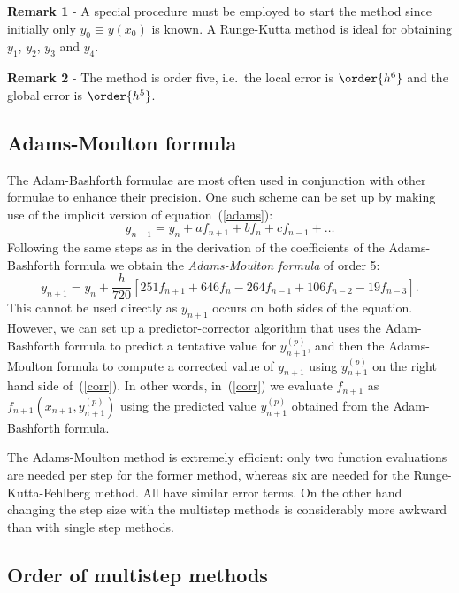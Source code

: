 \smallskip

\noindent \textbf{Remark 1} - A special procedure must be employed to
start the method since initially only $y_0 \equiv y(x_0)$ is known. A
Runge-Kutta method is ideal for obtaining $y_1$, $y_2$, $y_3$ and
$y_4$.

\smallskip

\noindent \textbf{Remark 2} - The method is order five, i.e.\ the local
error is $\order{h^6}$ and the global error is $\order{h^5}$.

\subsection{Adams-Moulton formula}

The Adam-Bashforth formulae are most often used in conjunction with
other formulae to enhance their precision.  One such scheme can be set
up by making use of the implicit version of equation~(\ref{adams}):
%
\begin{equation}
  y_{n+1} = y_n + a f_{n+1} + b f_n + c f_{n-1} + \ldots
\end{equation}
%
Following the same steps as in the derivation of the coefficients of
the Adams-Bashforth formula we obtain the \textit{Adams-Moulton
  formula} of order 5:
%
\begin{equation}
  y_{n+1} = y_n + \frac{h}{720} [ 251 f_{n+1} + 646 f_n - 264 f_{n-1} +
  106 f_{n-2} - 19 f_{n-3}].
 \label{corr}
\end{equation}
%
This cannot be used directly as $y_{n+1}$ occurs on both sides of the
equation. However, we can set up a predictor-corrector algorithm that
uses the Adam-Bashforth formula to predict a tentative value for
$y^{(p)}_{n+1}$, and then the Adams-Moulton formula to compute a
corrected value of $y_{n+1}$ using $y^{(p)}_{n+1}$ on the right hand
side of~(\ref{corr}).  In other words, in~(\ref{corr}) we evaluate
$f_{n+1}$ as $f_{n+1}(x_{n+1},y^{(p)}_{n+1})$ using the predicted
value $y^{(p)}_{n+1}$ obtained from the Adam-Bashforth formula.

The Adams-Moulton method is extremely efficient: only two function
evaluations are needed per step for the former method, whereas six are
needed for the Runge-Kutta-Fehlberg method.  All have similar error
terms.  On the other hand changing the step size with the multistep
methods is considerably more awkward than with single step methods.

\subsection{Order of multistep methods}

